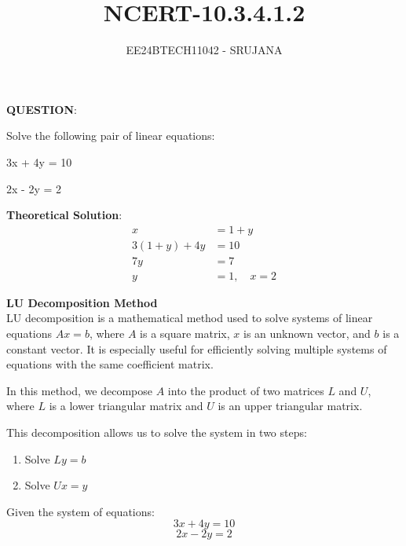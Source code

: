 \documentclass[journal]{IEEEtran}
\begin{document}

\vspace{3cm}

\title{NCERT-10.3.4.1.2}
\author{EE24BTECH11042 - SRUJANA}
{\let\newpage\relax\maketitle}

\renewcommand{\thefigure}{\theenumi}
\renewcommand{\thetable}{\theenumi}
\setlength{\intextsep}{10pt} 

\renewcommand{\thetable}{\theenumi}

\textbf{QUESTION}:

Solve the following pair of linear equations:

\hspace{3cm}3x + 4y = 10

\hspace{3cm}2x - 2y = 2

\textbf{Theoretical Solution}:\\

\begin{align}
    x &= 1 + y \tag{1} \\
    3(1 + y) + 4y &= 10 \tag{2} \\
    7y &= 7 \tag{3} \\
    y &= 1, \quad x = 2 \tag{4}
\end{align}

\textbf{LU Decomposition Method}\\

LU decomposition is a mathematical method used to solve systems of linear equations \(Ax = b\), where \(A\) is a square matrix, \(x\) is an unknown vector, and \(b\) is a constant vector. It is especially useful for efficiently solving multiple systems of equations with the same coefficient matrix.

In this method, we decompose \(A\) into the product of two matrices \(L\) and \(U\), where \(L\) is a lower triangular matrix and \(U\) is an upper triangular matrix.

This decomposition allows us to solve the system in two steps:
\begin{enumerate}
    \item Solve \(Ly = b\)
    \item Solve \(Ux = y\)
\end{enumerate}

Given the system of equations:
\[
3x + 4y = 10 \tag{5}
\]
\[
2x - 2y = 2 \tag{6}
\]
\end{document}
